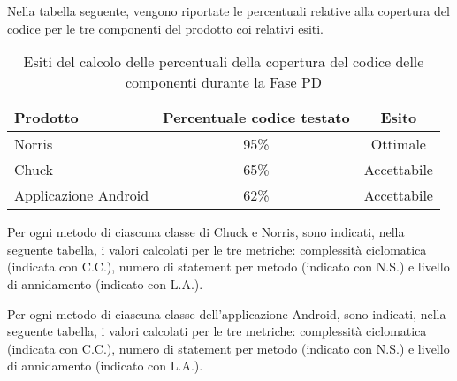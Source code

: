 				
			Nella tabella seguente, vengono riportate le percentuali relative alla copertura del codice per le tre componenti del prodotto coi relativi esiti.
			\begin{table}[H]
					\centering
						\begin{tabu}{| l | c | c |}
							\hline
							Prodotto	& Percentuale codice testato	& Esito		\\ \hline \hline
							Norris	&	95\% 	& Ottimale  \\ \hline
							Chuck	& 	65\%	& Accettabile  \\ \hline
							Applicazione Android	& 	62\%	& Accettabile  \\ \hline
						\end{tabu}
					\caption{Esiti del calcolo delle percentuali della copertura del codice delle componenti durante la Fase PD}
				\end{table}
			Per ogni metodo di ciascuna classe di Chuck e Norris, sono indicati, nella seguente tabella, i valori calcolati per le tre metriche: complessità ciclomatica (indicata con C.C.), numero di statement per metodo (indicato con N.S.) e livello di annidamento (indicato con L.A.).
				
			Per ogni metodo di ciascuna classe dell'applicazione Android, sono indicati, nella seguente tabella, i valori calcolati per le tre metriche: complessità ciclomatica (indicata con C.C.), numero di statement per metodo (indicato con N.S.) e livello di annidamento (indicato con L.A.).
				
				
